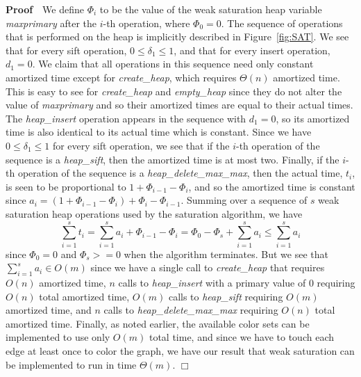 \noindent
{\bf Proof}\ \ 
We define $\Phi_i$ to be the value of the weak saturation heap variable 
{\em maxprimary\/} after the $i$-th operation, where $\Phi_0 = 0$.  The 
sequence of operations that is performed on the heap is implicitly described in 
Figure~\ref{fig:SAT}. We see that for every sift operation, 
$0 \leq \delta_1 \leq 1$, and that for every insert operation, $d_1 = 0$.  
We claim that all operations in this sequence need only constant amortized 
time except for {\em create\_heap}, which requires $\Theta(n)$ amortized time.
This is easy to see for {\em create\_heap\/} and {\em empty\_heap\/} since
they do not alter the value of {\em maxprimary\/} and so their amortized times 
are equal to their actual times.  The {\em heap\_insert\/} operation appears 
in the sequence with $d_1 = 0$, so its amortized time is also identical to 
its actual time which is constant. Since we have $0 \leq \delta_1 \leq 1$ for 
every sift operation, we see that if the $i$-th operation of the sequence 
is a {\em heap\_sift}, then the amortized time is at most two.  Finally,
if the $i$-th operation of the sequence is a {\em heap\_delete\_max\_max},
then the actual time, $t_i$, is seen to be proportional to
$1 + \Phi_{i-1} - \Phi_i$, and so the amortized time is constant since 
$a_i = \left( 1 + \Phi_{i-1} - \Phi_i \right) + \Phi_i - \Phi_{i-1}$.
Summing over a sequence of $s$ weak saturation heap operations used by the 
saturation algorithm, we have
\[
\sum_{i=1}^{s} t_i = \sum_{i=1}^{s} a_i + \Phi_{i-1} - \Phi_i 
= \Phi_0 - \Phi_s + \sum_{i=1}^{s} a_i \leq \sum_{i=1}^{s} a_i
\]
since $\Phi_0 = 0$ and $\Phi_s >= 0$ when the algorithm terminates.  But we 
see that $\sum_{i=1}^{s} a_i \in O(m)$ since we have a single call 
to {\em create\_heap\/} that requires $O(n)$ amortized time, $n$ calls 
to {\em heap\_insert\/} with a primary value of 0 requiring $O(n)$ total 
amortized time, $O(m)$ calls to {\em heap\_sift\/} requiring $O(m)$ amortized 
time, and $n$ calls to {\em heap\_delete\_max\_max\/} requiring $O(n)$ total 
amortized time.  Finally, as noted earlier, the available color sets can be 
implemented to use only $O(m)$ total time, and since we have to touch each 
edge at least once to color the graph, we have our result that
weak saturation can be implemented to run in time $\Theta(m)$. 
\hfill $\Box$
\medskip
 

